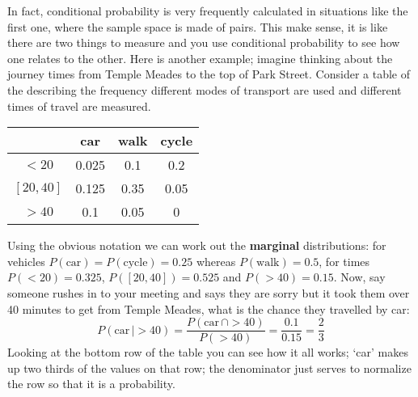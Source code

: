 \documentclass[11pt,a4paper]{scrartcl}
\begin{document}
In fact, conditional probability is very frequently calculated in
situations like the first one, where the sample space is made of
pairs. This make sense, it is like there are two things to measure and
you use conditional probability to see how one relates to the
other. Here is another example; imagine thinking about the journey
times from Temple Meades to the top of Park Street. Consider a table
of the describing the frequency different modes of transport are used
and different times of travel are measured.
\begin{center}
\begin{tabular}{c|ccc}
        &car    &walk  &cycle\\
\hline
$<20$     &0.025  &0.1   &0.2\\
$[20,40]$ &0.125  &0.35  &0.05\\
$>40$     &0.1    &0.05  &0
\end{tabular}
\end{center}
Using the obvious notation we can work out the \textbf{marginal}
distributions: for vehicles $P(\mbox{car})=P(\mbox{cycle})=0.25$ whereas
$P(\mbox{walk})=0.5$, for times $P(<20)=0.325$, $P([20,40])=0.525$ and
$P(>40)=0.15$. Now, say someone rushes in to your meeting and says
they are sorry but it took them over 40 minutes to get from Temple
Meades, what is the chance they travelled by car:
\begin{equation}
P(\mbox{car}\,|>40)=\frac{P(\mbox{car}\,\cap >40)}{P(>40)}=\frac{0.1}{0.15}=\frac{2}{3}
\end{equation}
Looking at the bottom row of the table you can see how it all works;
\lq{}car\rq{} makes up two thirds of the values on that row; the
denominator just serves to normalize the row so that it is a
probability.



\end{document}
